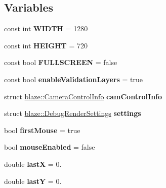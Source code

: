 \subsection*{Variables}
\begin{DoxyCompactItemize}
\item 
\mbox{\label{namespaceblaze_ac9bf3a09e1e335fd919fe6ca4b93e975}} 
const int {\bfseries W\+I\+D\+TH} = 1280
\item 
\mbox{\label{namespaceblaze_af2ea1874a92b1a556bc44f3791389cdd}} 
const int {\bfseries H\+E\+I\+G\+HT} = 720
\item 
\mbox{\label{namespaceblaze_abbef56a56ee01b1f6933d778e576724f}} 
const bool {\bfseries F\+U\+L\+L\+S\+C\+R\+E\+EN} = false
\item 
\mbox{\label{namespaceblaze_a8e1784b05273c6fd00a69ff9d2d64b85}} 
const bool {\bfseries enable\+Validation\+Layers} = true
\item 
\mbox{\label{namespaceblaze_aa5dd5bd7a6bc31b91ff1010d8f162434}} 
struct \hyperlink{structblaze_1_1CameraControlInfo}{blaze\+::\+Camera\+Control\+Info} {\bfseries cam\+Control\+Info}
\item 
\mbox{\label{namespaceblaze_a60b8dbbd5f4b977cbbf6a9b7262ae996}} 
struct \hyperlink{structblaze_1_1DebugRenderSettings}{blaze\+::\+Debug\+Render\+Settings} {\bfseries settings}
\item 
\mbox{\label{namespaceblaze_a97ba96ec93e196bd81171dd8f6e90f87}} 
bool {\bfseries first\+Mouse} = true
\item 
\mbox{\label{namespaceblaze_a84243686667c72d4f2179f550e236d7b}} 
bool {\bfseries mouse\+Enabled} = false
\item 
\mbox{\label{namespaceblaze_a85c05c1723649894ec8ccdb42e0c7b20}} 
double {\bfseries lastX} = 0.
\item 
\mbox{\label{namespaceblaze_a805650b8c3f67b08d175ec71750a78e2}} 
double {\bfseries lastY} = 0.
\item 

\end{DoxyCompactItemize}
